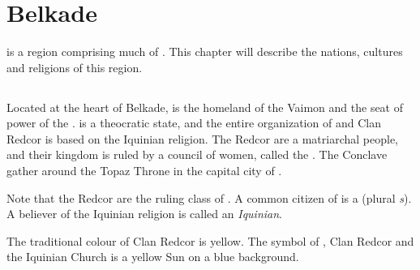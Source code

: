 \chapter{Belkade}
\label{Belkade}
 is a region comprising much of \KnownWorld{}. %
This chapter will describe the nations, cultures and religions of this region. 







\section{\Redce}
\label{Redce}
\index{\Redce}

Located at the heart of Belkade, \Redce{} is the homeland of the Vaimon  and the seat of power of the . \Redce{} is a theocratic state, and the entire organization of \Redce{} and Clan Redcor is based on the Iquinian religion. The Redcor are a matriarchal people, and their kingdom is ruled by a council of women, called the . The Conclave gather around the Topaz Throne in the capital city of \Redce{}. 

\index{\Redcean}
Note that the Redcor are the ruling class of \Redce{}. A common citizen of \Redce{} is a \Redcean{} (plural \emph{\Redcean{}s}). A believer of the Iquinian religion is called an \emph{Iquinian}. 

The traditional colour of Clan Redcor is yellow. The symbol of \Redce{}, Clan Redcor and the Iquinian Church is a yellow Sun on a blue background. 

